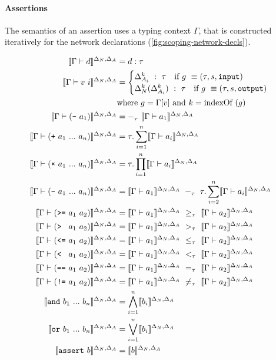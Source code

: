 \paragraph{Assertions}
The semantics of an assertion uses a typing context $\Gamma$, that is constructed iteratively for the network declarations (\autoref{fig:scoping-network-decls}).

\begin{align}
    \semenv{\Gamma\vdash{d}} &= d : \tau \\
    \semenv{\Gamma\vdash{v~i}} &= 
    \begin{cases}
        \Delta_{A_i}^k~:~\tau\quad\text{if}~g~\equiv (\tau,s,\texttt{input})\\
        \Delta_{N}^k(\Delta_{A_i}^k)~:~\tau\quad\text{if}~g~\equiv (\tau,s,\texttt{output})\\
    \end{cases} \\
    &\text{where}~g = \Gamma[v]~\text{and}~k = \text{indexOf}~(g)\notag\\
    \semenv{\Gamma\vdash(\text{\texttt{-}}~a_1)} &= -_\tau~\semenv{\Gamma\vdash{a_1}} \\
    \semenv{\Gamma\vdash(\text{\texttt{+}}~a_1~...~a_n)} &= \tau.\sum^{n}_{i=1}\semenv{\Gamma\vdash{a_i}} \\
    \semenv{\Gamma\vdash(\text{\texttt{×}}~a_1~...~a_n)} &= \tau.\prod^{n}_{i=1}\semenv{\Gamma\vdash{a_i}} \\
    \semenv{\Gamma\vdash(\text{\texttt{-}}~a_1~...~a_n)} &= \semenv{\Gamma\vdash{a_1}}~-_\tau~\tau.\sum^{n}_{i=2}\semenv{\Gamma\vdash{a_i}} \\
    \semenv{\Gamma\vdash(\text{\texttt{>=}}~a_1~a_2)} &= \semenv{\Gamma\vdash{a_1}}~\geq_\tau~\semenv{\Gamma\vdash{a_2}} \\
    \semenv{\Gamma\vdash(\text{\texttt{> }}~a_1~a_2)} &= \semenv{\Gamma\vdash{a_1}}~>_\tau~\semenv{\Gamma\vdash{a_2}} \\
    \semenv{\Gamma\vdash(\text{\texttt{<=}}~a_1~a_2)} &= \semenv{\Gamma\vdash{a_1}}~\leq_\tau~\semenv{\Gamma\vdash{a_2}} \\
    \semenv{\Gamma\vdash(\text{\texttt{< }}~a_1~a_2)} &= \semenv{\Gamma\vdash{a_1}}~<_\tau~\semenv{\Gamma\vdash{a_2}} \\
    \semenv{\Gamma\vdash(\text{\texttt{==}}~a_1~a_2)} &= \semenv{\Gamma\vdash{a_1}}~=_\tau~\semenv{\Gamma\vdash{a_2}} \\
    \semenv{\Gamma\vdash(\text{\texttt{!=}}~a_1~a_2)} &= \semenv{\Gamma\vdash{a_1}}~\neq_\tau~\semenv{\Gamma\vdash{a_2}} \\
    \semenv{\text{\texttt{and}}~b_1~...~b_n} &=\bigwedge^{n}_{i=1}\semenv{b_i}\\
    \semenv{\text{\texttt{or}}~b_1~...~b_n} &=\bigvee^{n}_{i=1}\semenv{b_i}\\
    \semenv{\text{\texttt{assert}}~b} &= \semenv{b}
\end{align}